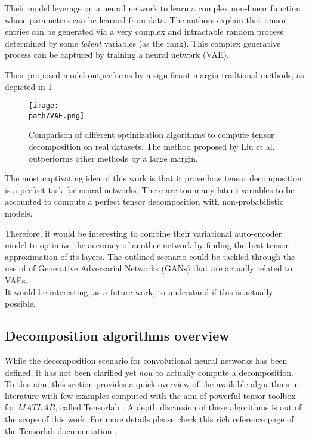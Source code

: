 Their model leverage on a neural network to learn a complex non-linear function whose parameters can be learned from data. The authors explain that tensor entries can be generated via a very complex and intractable random process determined by some \emph{latent} variables (as the rank). This complex generative process can be captured by training a neural network (VAE). 

Their proposed model outperforms by a significant margin tradtional methods, as depicted in \ref{fig:VAE}

\begin{figure}[h!]
 \centering
 \texttt{[image: \\path/VAE.png]} 
 \caption{Comparison of different optimization algorithms to compute tensor decomposition on real datasets. The method proposed by Liu et al. outperforms other methods by a large margin.}
 \label{fig:VAE}
\end{figure} 

\newpage 
The most captivating idea of this work is that it prove how tensor decomposition is a perfect task for neural networks. There are too many latent variables to be accounted to compute a perfect tensor decomposition with non-probabilistic models. 

Therefore, it would be interesting to combine their variational auto-encoder model to optimize the accuracy of another network by finding the best tensor approximation of its layers. The outlined scenario could be tackled through the use of of Generative Adversarial Networks (GANs)\parencite{GAN} that are actually related to VAEs.\\
 It would be interesting, as a future work, to understand if this is actually possible. 


\subsection{Decomposition algorithms overview}
While the decomposition scenario for convolutional neural networks has been defined, it has not been clarified yet \emph{how} to actually compute a decomposition. To this aim, this section provides a quick overview of the available algorithms in literature with few examples computed with the aim of powerful tensor toolbox for $MATLAB$, called Tensorlab \parencite{WTensorlab}. \newline
A depth discussion of these algorithms is out of the scope of this work. For more details please check this rich reference page of the Tensorlab documentation \parencite{WTensorlab-ref}.

